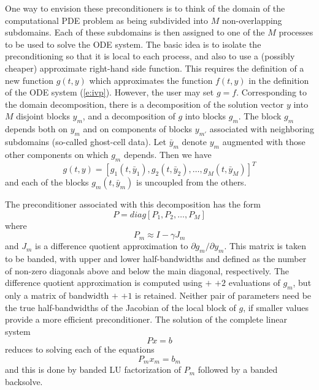 One way to envision these preconditioners is to think of the domain of
the computational PDE problem as being subdivided into $M$ non-overlapping
subdomains.  Each of these subdomains is then assigned to one of the
$M$ processes to be used to solve the ODE system. The basic idea is
to isolate the preconditioning so that it is local to each process,
and also to use a (possibly cheaper) approximate right-hand side
function. This requires the definition of a new function $g(t,y)$
which approximates the function $f(t, y)$ in the definition of the ODE
system (\ref{e:ivp}). However, the user may set $g = f$.  Corresponding
to the domain decomposition, there is a decomposition of the solution
vector $y$ into $M$ disjoint blocks $y_m$, and a decomposition of $g$
into blocks $g_m$.  The block $g_m$ depends both on $y_m$ and on
components of blocks $y_{m'}$ associated with neighboring subdomains
(so-called ghost-cell data).  Let $\bar{y}_m$ denote $y_m$ augmented
with those other components on which $g_m$ depends.  Then we have
\begin{equation}
  g(t,y) = [g_1(t,\bar{y}_1), g_2(t,\bar{y}_2), \ldots, g_M(t,\bar{y}_M)]^T
\end{equation}
and each of the blocks $g_m(t, \bar{y}_m)$ is uncoupled from the others.

The preconditioner associated with this decomposition has the form
\begin{equation}
  P= diag[P_1, P_2, \ldots, P_M]
\end{equation}
where
\begin{equation}
  P_m \approx I - \gamma J_m
\end{equation}
and $J_m$ is a difference quotient approximation to
$\partial g_m/\partial y_m$. This matrix is taken to be banded, with
upper and lower half-bandwidths  and  defined as
the number of non-zero diagonals above and below the main diagonal,
respectively. The difference quotient approximation is computed using
 $+$  $+ 2$ evaluations of $g_m$, but only a matrix
of bandwidth  $+$  $+ 1$ is retained.
Neither pair of parameters need be the true half-bandwidths of the Jacobian of the
local block of $g$, if smaller values provide a more efficient
preconditioner. The solution of the complete linear system
\begin{equation}
  Px = b
\end{equation}
reduces to solving each of the equations
\begin{equation}
  P_m x_m = b_m
\end{equation}
and this is done by banded LU factorization of $P_m$ followed by a banded
backsolve.

